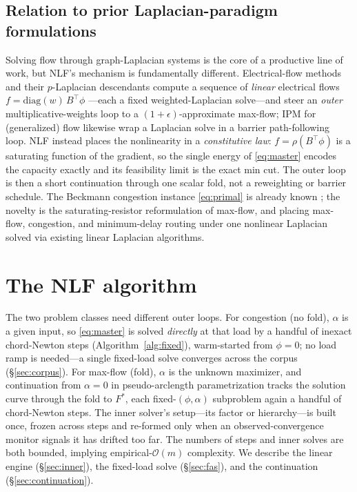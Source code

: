 \documentclass{siamart220329}
\newcommand{\Om}{\mathcal{O}(m)}
\begin{document}
\subsection{Relation to prior Laplacian-paradigm formulations} Solving flow through graph-Laplacian
systems is the core of a productive line of work, but NLF's mechanism is fundamentally different. Electrical-flow methods~\cite{christiano-etal} and their $p$-Laplacian
descendants compute a sequence of \emph{linear} electrical flows $f=\mathrm{diag}(w)\,B^{\top}\phi$
---each a fixed weighted-Laplacian solve---and steer an \emph{outer} multiplicative-weights loop to a
$(1+\epsilon)$-approximate max-flow; IPM for (generalized) flow
\cite{daitch-spielman} likewise wrap a Laplacian solve in a barrier path-following loop. NLF instead places the nonlinearity in a \emph{constitutive law}: $f=\rho(B^{\top}\phi)$ is a
saturating function of the gradient, so the single energy of \eqref{eq:master} encodes the
capacity exactly and its feasibility limit is the exact min cut. The outer loop is then a short continuation through one scalar fold, not a reweighting or
barrier schedule. The Beckmann congestion instance \eqref{eq:primal} is already known
\cite{beckmann}; the novelty is the saturating-resistor reformulation of max-flow, and placing max-flow, congestion, and minimum-delay routing under one
nonlinear Laplacian solved via existing linear Laplacian algorithms.

\section{The NLF algorithm}\label{sec:algorithm}
The two problem classes need different outer loops. For congestion (no fold), $\alpha$ is a given input, so \eqref{eq:master} is solved \emph{directly} at that load by a handful of inexact chord-Newton steps (Algorithm~\ref{alg:fixed}), warm-started from $\phi=0$; no load ramp is needed---a single fixed-load solve converges across the corpus (\S\ref{sec:corpus}). For max-flow (fold), $\alpha$ is the unknown maximizer, and continuation from $\alpha=0$ in pseudo-arclength parametrization tracks the solution curve through the fold to $F^*$, each fixed-$(\phi,\alpha)$ subproblem again a handful of chord-Newton steps. The inner solver's setup---its factor or hierarchy---is built once, frozen across steps and re-formed only when an observed-convergence monitor signals it has drifted too far. The numbers of steps and inner solves are both bounded, implying empirical-$\Om$ complexity. We describe the linear engine
(\S\ref{sec:inner}), the fixed-load solve (\S\ref{sec:fas}), and the continuation (\S\ref{sec:continuation}).
\end{document}
